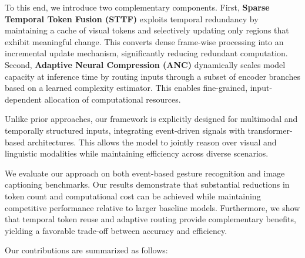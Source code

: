 \documentclass{article}
\begin{document}
To this end, we introduce two complementary components. First, \textbf{Sparse Temporal Token Fusion (STTF)} exploits temporal redundancy by maintaining a cache of visual tokens and selectively updating only regions that exhibit meaningful change. This converts dense frame-wise processing into an incremental update mechanism, significantly reducing redundant computation. Second, \textbf{Adaptive Neural Compression (ANC)} dynamically scales model capacity at inference time by routing inputs through a subset of encoder branches based on a learned complexity estimator. This enables fine-grained, input-dependent allocation of computational resources.

Unlike prior approaches, our framework is explicitly designed for multimodal and temporally structured inputs, integrating event-driven signals with transformer-based architectures. This allows the model to jointly reason over visual and linguistic modalities while maintaining efficiency across diverse scenarios.

We evaluate our approach on both event-based gesture recognition and image captioning benchmarks. Our results demonstrate that substantial reductions in token count and computational cost can be achieved while maintaining competitive performance relative to larger baseline models. Furthermore, we show that temporal token reuse and adaptive routing provide complementary benefits, yielding a favorable trade-off between accuracy and efficiency.

Our contributions are summarized as follows:
\end{document}
